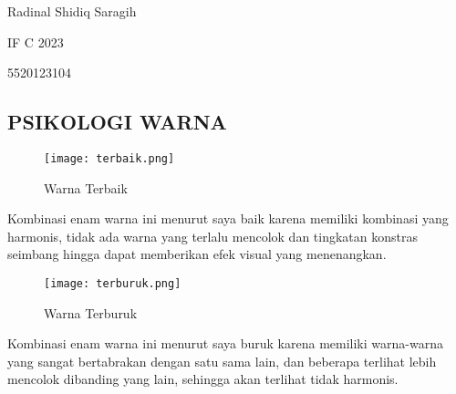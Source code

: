 \documentclass[12pt,a4paper]{article}
\date{}
\begin{document}
  Radinal Shidiq Saragih

  IF C 2023

  5520123104


  \begin{center}
    \section*{PSIKOLOGI WARNA}
  \end{center}


\begin{figure}[h]
  \centering
  \texttt{[image: terbaik.png]}
  \caption{\small{Warna Terbaik}}
\end{figure}

Kombinasi enam warna ini menurut saya baik karena memiliki kombinasi
yang harmonis, tidak ada warna yang terlalu mencolok dan tingkatan konstras
seimbang hingga dapat memberikan efek visual yang menenangkan.

\begin{figure}[h]
  \centering
  \texttt{[image: terburuk.png]}
  \caption{\small{Warna Terburuk}}
\end{figure}

Kombinasi enam warna ini menurut saya buruk karena memiliki
warna-warna yang sangat bertabrakan dengan satu sama lain,
dan beberapa terlihat lebih mencolok dibanding yang lain, sehingga
akan terlihat tidak harmonis.
\end{document}
